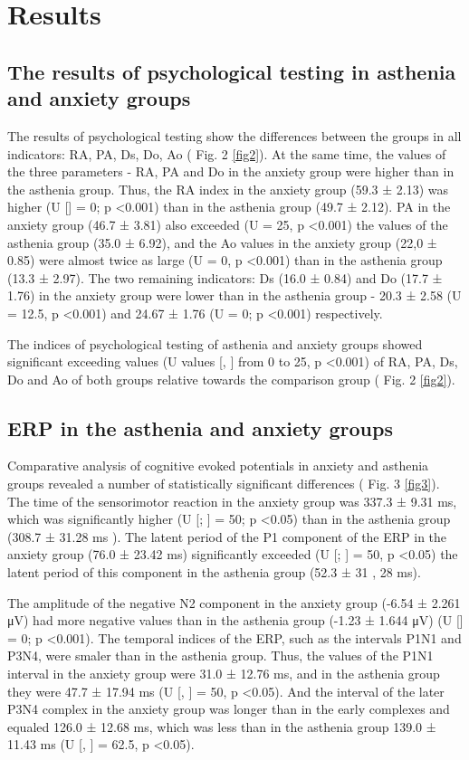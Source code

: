 \documentclass[twocolumn]{article}
\begin{document}
\section {Results}
\subsection {The results of psychological testing in asthenia and anxiety groups}
\par The results of psychological testing show the differences between the groups in all indicators: RA, PA, Ds, Do, Ao ( Fig. 2 \ref{fig2}). At the same time, the values of the three parameters - RA, PA and Do in the anxiety group were higher than in the asthenia group. Thus, the RA index in the anxiety group (59.3 ± 2.13) was higher (U [\cite{bib15}] = 0; p <0.001) than in the asthenia group (49.7 ± 2.12). PA in the anxiety group (46.7 ± 3.81) also exceeded (U = 25, p <0.001) the values of the asthenia group (35.0 ± 6.92), and the Ao values in the anxiety group (22,0 ± 0.85) were almost twice as large (U = 0, p <0.001) than in the asthenia group (13.3 ± 2.97). The two remaining indicators: Ds (16.0 ± 0.84) and Do (17.7 ± 1.76) in the anxiety group were lower than in the asthenia group - 20.3 ± 2.58 (U = 12.5, p <0.001) and 24.67 ± 1.76 (U = 0; p <0.001) respectively. 
\par 	The indices of psychological testing of asthenia and anxiety groups showed significant exceeding values (U values [\cite{bib15}, \cite{bib20}] from 0 to 25, p <0.001) of RA, PA, Ds, Do and Ao of both groups relative towards the comparison group ( Fig. 2 \ref{fig2}).
\subsection {	ERP in the asthenia and anxiety groups}
\par 	Comparative analysis of cognitive evoked potentials in anxiety and asthenia groups revealed a number of statistically significant differences ( Fig. 3 \ref{fig3}). The time of the sensorimotor reaction in the anxiety group was 337.3 ± 9.31 ms, which was significantly higher (U [\cite{bib15}; \cite{bib15}] = 50; p <0.05) than in the asthenia group (308.7 ± 31.28 ms ). The latent period of the P1 component of the ERP in the anxiety group (76.0 ± 23.42 ms) significantly exceeded (U [\cite{bib15}; \cite{bib15}] = 50, p <0.05) the latent period of this component in the asthenia group (52.3 ± 31 , 28 ms). 
\par The amplitude of the negative N2 component in the anxiety group (-6.54 ± 2.261 μV) had more negative values than in the asthenia group (-1.23 ± 1.644 μV) (U [\cite{bib15}] = 0; p <0.001). The temporal indices of the ERP, such as the intervals P1N1 and P3N4, were smaler than in the asthenia group. Thus, the values of the P1N1 interval in the anxiety group were 31.0 ± 12.76 ms, and in the asthenia group they were 47.7 ± 17.94 ms (U [\cite{bib15}, \cite{bib15}] = 50, p <0.05). And the interval of the later P3N4 complex  in the anxiety group was longer than in the early complexes and equaled 126.0 ± 12.68 ms, which was less than in the asthenia group 139.0 ± 11.43 ms (U [\cite{bib15}, \cite{bib15} ] = 62.5, p <0.05). 
\end{document}

